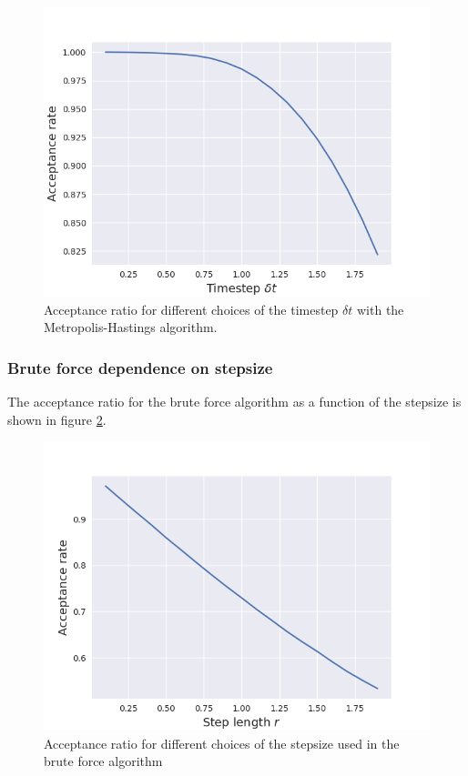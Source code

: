 \documentclass[norsk,a4paper,12pt]{article}
\begin{document}
\begin{figure} [H]
	\centering
	\includegraphics[scale=0.65]{images/acceptance_IS.png}
	\caption{Acceptance ratio for different choices of the timestep $\delta t$  with the Metropolis-Hastings algorithm.}
	\label{fig:acceptance_IS_timestep}
\end{figure} 

\subsubsection{Brute force dependence on stepsize}
The acceptance ratio for the brute force algorithm as a function of the stepsize is shown in figure \ref{fig:acceptance_BF_stepsize}. 

\begin{figure} [H]
	\centering
	\includegraphics[scale=0.65]{images/acceptance_BF.png}
	\caption{Acceptance ratio for different choices of the stepsize used in the brute force algorithm}
	\label{fig:acceptance_BF_stepsize}
\end{figure} 
\end{document}

